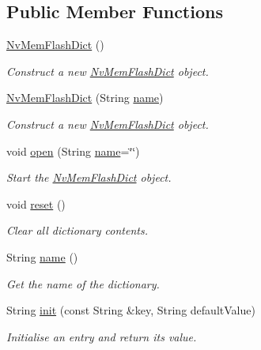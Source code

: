 \subsection*{Public Member Functions}
\begin{DoxyCompactItemize}
\item 
\mbox{\hyperlink{class_nv_mem_flash_dict_a2756e9c688e80634ea15f5ded9a3cd6f}{Nv\+Mem\+Flash\+Dict}} ()
\begin{DoxyCompactList}\small\item\em Construct a new \mbox{\hyperlink{class_nv_mem_flash_dict}{Nv\+Mem\+Flash\+Dict}} object. \end{DoxyCompactList}\item 
\mbox{\hyperlink{class_nv_mem_flash_dict_aae2853114a90569df480672f870818b2}{Nv\+Mem\+Flash\+Dict}} (String \mbox{\hyperlink{class_nv_mem_flash_dict_a55888a3489875052acc0602499cc73fe}{name}})
\begin{DoxyCompactList}\small\item\em Construct a new \mbox{\hyperlink{class_nv_mem_flash_dict}{Nv\+Mem\+Flash\+Dict}} object. \end{DoxyCompactList}\item 
void \mbox{\hyperlink{class_nv_mem_flash_dict_a82853c97e48c0bfcef79afde94ba0b56}{open}} (String \mbox{\hyperlink{class_nv_mem_flash_dict_a55888a3489875052acc0602499cc73fe}{name}}=\char`\"{}\char`\"{})
\begin{DoxyCompactList}\small\item\em Start the \mbox{\hyperlink{class_nv_mem_flash_dict}{Nv\+Mem\+Flash\+Dict}} object. \end{DoxyCompactList}\item 
void \mbox{\hyperlink{class_nv_mem_flash_dict_a77ef71d649eb918d527f17e2d10aa622}{reset}} ()
\begin{DoxyCompactList}\small\item\em Clear all dictionary contents. \end{DoxyCompactList}\item 
String \mbox{\hyperlink{class_nv_mem_flash_dict_a55888a3489875052acc0602499cc73fe}{name}} ()
\begin{DoxyCompactList}\small\item\em Get the name of the dictionary. \end{DoxyCompactList}\item 
String \mbox{\hyperlink{class_nv_mem_flash_dict_a25030ea9f57f53339b5f550fc89361af}{init}} (const String \&key, String default\+Value)
\begin{DoxyCompactList}\small\item\em Initialise an entry and return its value. \end{DoxyCompactList}\item 

\end{DoxyCompactItemize}

